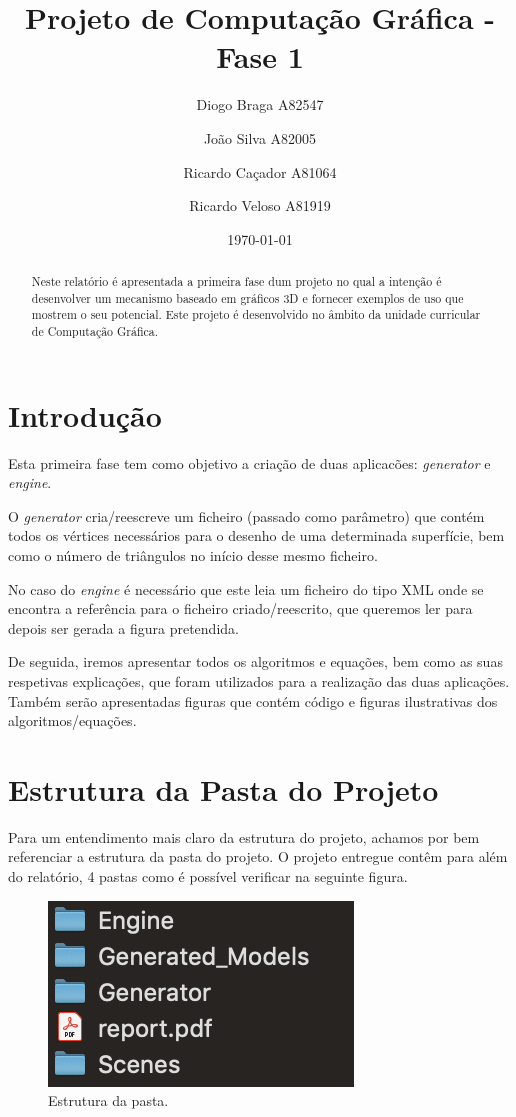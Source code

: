 \documentclass[a4paper]{article}
\title{Projeto de Computação Gráfica - Fase 1}
\author{Diogo Braga A82547 \and João Silva A82005 \and Ricardo Caçador A81064
\and Ricardo Veloso A81919}
\date{\today}
\begin{document}
\maketitle

\begin{abstract}
Neste relatório é apresentada a primeira fase dum projeto no qual a intenção é desenvolver um mecanismo baseado em gráficos 3D e fornecer exemplos de uso que mostrem o seu potencial. Este projeto é desenvolvido no âmbito da unidade curricular de Computação Gráfica.
\end{abstract}

\tableofcontents

\newpage


\section{Introdução}
\label{sec:intro}

Esta primeira fase tem como objetivo a criação de duas aplicacões: \textit{generator} e \textit{engine}.

O \textit{generator} cria/reescreve um ficheiro (passado como parâmetro) que contém todos os vértices necessários para o desenho de uma determinada superfície, bem como o número de triângulos no início desse mesmo ficheiro.

No caso do \textit{engine} é necessário que este leia um ficheiro do tipo XML onde se encontra a referência para o ficheiro criado/reescrito, que queremos ler para depois ser gerada a figura pretendida.

De seguida, iremos apresentar todos os algoritmos e equações, bem como as suas respetivas explicações, que foram utilizados para a realização das duas aplicações. Também serão apresentadas figuras que contém código e figuras ilustrativas dos algoritmos/equações.

\section{Estrutura da Pasta do Projeto}
\label{sec:estrutura}

Para um entendimento mais claro da estrutura do projeto, achamos por bem referenciar a estrutura da pasta do projeto.
O projeto entregue contêm para além do relatório, 4 pastas como é possível verificar na seguinte figura.

\begin{figure}[H]
\centering
\includegraphics[scale=1.0]{estrutura.png}
\caption{Estrutura da pasta.}
\label{img:estrutura}
\end{figure}
\end{document}
